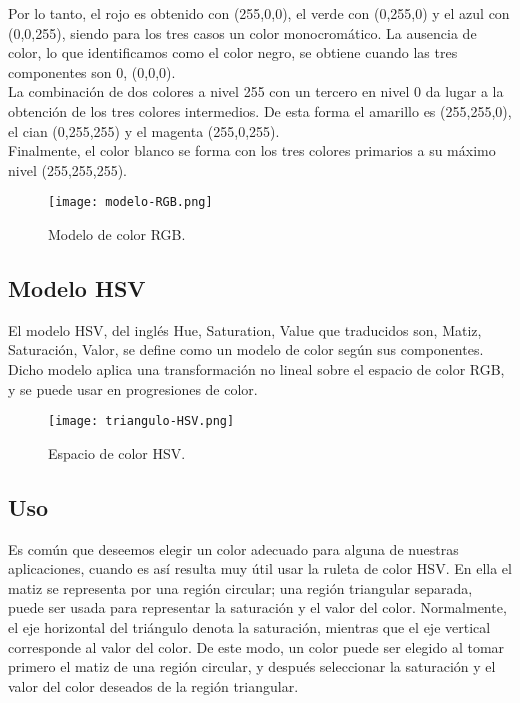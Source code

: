Por lo tanto, el rojo es obtenido con (255,0,0), el verde con (0,255,0) y el azul con (0,0,255), siendo para los tres casos un color monocromático. La ausencia de color, lo que identificamos como el color negro, se obtiene cuando las tres componentes son 0, (0,0,0).\\

La combinación de dos colores a nivel 255 con un tercero en nivel 0 da lugar a la obtención de los tres colores intermedios. De esta forma el amarillo es (255,255,0), el cian (0,255,255) y el magenta (255,0,255).\\

Finalmente, el color blanco se forma con los tres colores primarios a su máximo nivel (255,255,255).\\

\begin{figure}[H]
  \begin{center}
    \texttt{[image: modelo-RGB.png]}
  \end{center}
  \caption{Modelo de color RGB.}
  \label{modelo-RGB}
\end{figure}

\subsection{Modelo HSV}

El modelo HSV, del inglés Hue, Saturation, Value que traducidos son,  Matiz, Saturación, Valor, se define como un modelo de color según sus componentes. Dicho modelo aplica una transformación no lineal sobre el espacio de color RGB, y se puede usar en progresiones de color.\\

\begin{figure}[H]
  \begin{center}
    \texttt{[image: triangulo-HSV.png]}
  \end{center}
  \caption{Espacio de color HSV.}
  \label{modelo-RGB}
\end{figure}

\subsection{Uso}

Es común que deseemos elegir un color adecuado para alguna de nuestras aplicaciones, cuando es así resulta muy útil usar la ruleta de color HSV. En ella el matiz se representa por una región circular; una región triangular separada, puede ser usada para representar la saturación y el valor del color. Normalmente, el eje horizontal del triángulo denota la saturación, mientras que el eje vertical corresponde al valor del color. De este modo, un color puede ser elegido al tomar primero el matiz de una región circular, y después seleccionar la saturación y el valor del color deseados de la región triangular.\\

